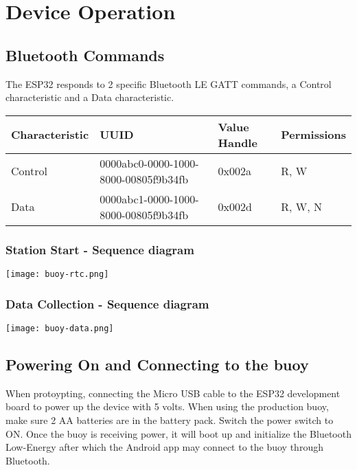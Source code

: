 \section{Device Operation} \label{device-operation}

\subsection{Bluetooth Commands}

\begin{flushleft}
    The ESP32 responds to 2 specific Bluetooth LE GATT commands, a Control characteristic and a Data characteristic.
\end{flushleft}

\begin{center}
    \begin{tabular}{ |l|l|l|l| }
        \hline 
        \footnotesize Characteristic & \footnotesize UUID & \footnotesize Value Handle & \footnotesize Permissions \\
        \hline 
        \scriptsize Control & \scriptsize 0000abc0-0000-1000-8000-00805f9b34fb & \scriptsize 0x002a & \scriptsize R, W \\
        \hline 
        \scriptsize Data & \scriptsize 0000abc1-0000-1000-8000-00805f9b34fb & \scriptsize 0x002d & \scriptsize R, W, N \\
        \hline
    \end{tabular}
\end{center}

\subsubsection{Station Start - Sequence diagram}

\texttt{[image: buoy-rtc.png]}

\subsubsection{Data Collection - Sequence diagram}

\texttt{[image: buoy-data.png]}

\subsection{Powering On and Connecting to the buoy}

When protoypting, connecting the Micro USB cable to the ESP32 development board to power up the device with 5 volts.
When using the production buoy, make sure 2 AA batteries are in the battery pack. Switch the power switch to ON.
Once the buoy is receiving power, it will boot up and initialize the Bluetooth Low-Energy after which the Android app may connect to the buoy through Bluetooth.